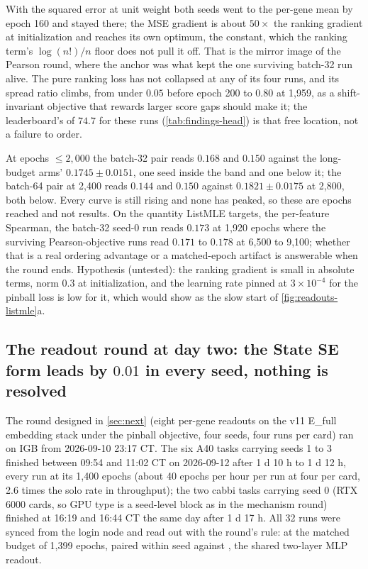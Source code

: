  With the squared error at unit
weight both seeds went to the per-gene mean by epoch 160 and stayed there; the MSE
gradient is about $50\times$ the ranking gradient at initialization and reaches its own
optimum, the constant, which the ranking term's $\log(n!)/n$ floor does not pull it off.
That is the mirror image of the Pearson round, where the anchor was what kept the one
surviving batch-32 run alive. The pure ranking loss has not collapsed at any of its four
runs, and its spread ratio climbs, from under $0.05$ before epoch 200 to $0.80$ at 1{,}959,
as a shift-invariant objective that rewards larger score gaps should make it; the
leaderboard's  of $74.7$ for these runs (\cref{tab:findings-head}) is that
free location, not a failure to order.

 At epochs $\le 2{,}000$
the batch-32 pair reads $0.168$ and $0.150$ against the long-budget arms' $0.1745 \pm
0.0151$, one seed inside the band and one below it; the batch-64 pair at 2{,}400 reads
$0.144$ and $0.150$ against $0.1821 \pm 0.0175$ at 2{,}800, both below. Every curve is
still rising and none has peaked, so these are epochs reached and not results. On the
quantity ListMLE targets, the per-feature Spearman, the batch-32 seed-0 run reads
$0.173$ at 1{,}920 epochs where the surviving Pearson-objective runs read $0.171$ to
$0.178$ at 6{,}500 to 9{,}100; whether that is a real ordering advantage or a matched-epoch
artifact is answerable when the round ends. Hypothesis (untested): the ranking gradient is
small in absolute terms, norm $0.3$ at initialization, and the learning rate pinned at
$3 \times 10^{-4}$ for the pinball loss is low for it, which would show as the slow start
of \cref{fig:readouts-listmle}a.

\subsection{The readout round at day two: the State SE form leads by $0.01$ in every
seed, nothing is resolved}
\label{sec:readouts-head}

The round designed in \cref{sec:next} (eight per-gene readouts on the v11 E\_full
embedding stack under the pinball objective, four seeds, four runs per card) ran on IGB
from 2026-09-10 23:17 CT. The six A40 tasks carrying seeds 1 to 3 finished between 09:54
and 11:02 CT on 2026-09-12 after 1 d 10 h to 1 d 12 h, every run at its 1,400 epochs
(about 40 epochs per hour per run at four per card, 2.6 times the solo rate in
throughput); the two cabbi tasks carrying seed 0 (RTX 6000 cards, so GPU type is a
seed-level block as in the mechanism round) finished at 16:19 and 16:44 CT the same day
after 1 d 17 h. All 32 runs were synced from the login node and read out with the
round's rule:  at the matched budget of 1,399 epochs, paired within seed
against , the shared two-layer MLP readout.

